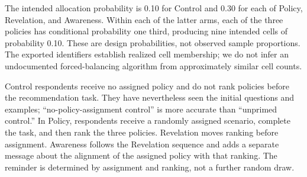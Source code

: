 The intended allocation probability is 0.10 for Control and 0.30 for each of Policy, Revelation, and Awareness. Within each of the latter arms, each of the three policies has conditional probability one third, producing nine intended cells of probability 0.10. These are design probabilities, not observed sample proportions. The exported identifiers establish realized cell membership; we do not infer an undocumented forced-balancing algorithm from approximately similar cell counts.

Control respondents receive no assigned policy and do not rank policies before the recommendation task. They have nevertheless seen the initial questions and examples; ``no-policy-assignment control'' is more accurate than ``unprimed control.'' In Policy, respondents receive a randomly assigned scenario, complete the task, and then rank the three policies. Revelation moves ranking before assignment. Awareness follows the Revelation sequence and adds a separate message about the alignment of the assigned policy with that ranking. The reminder is determined by assignment and ranking, not a further random draw.

\begin{figure}[!htbp]\centering\color{added}
\caption{}\label{fig:timelineB}
\end{figure}

